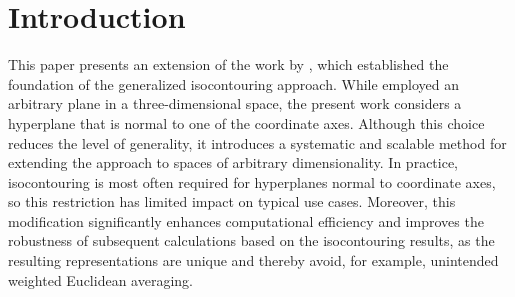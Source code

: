 \section{Introduction}\label{sec:Intro}
This paper presents an extension of the work by \cite{OellerichBuescherDegel2023_1000162443}, which established the foundation of the generalized isocontouring approach. While \cite{OellerichBuescherDegel2023_1000162443} employed an arbitrary plane in a three-dimensional space, the present work considers a hyperplane that is normal to one of the coordinate axes. Although this choice reduces the level of generality, it introduces a systematic and scalable method for extending the approach to spaces of arbitrary dimensionality. In practice, isocontouring is most often required for hyperplanes normal to coordinate axes, so this restriction has limited impact on typical use cases. Moreover, this modification significantly enhances computational efficiency and improves the robustness of subsequent calculations based on the isocontouring results, as the resulting representations are unique and thereby avoid, for example, unintended weighted Euclidean averaging.
